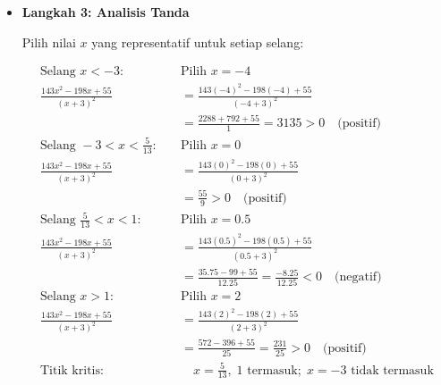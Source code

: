 \documentclass[10pt,a4paper]{article}
\newcounter{eqblock}
\newcommand{\reseteq}{%
  \stepcounter{eqblock}%
  \setcounter{equation}{0}%
  \renewcommand{\theHequation}{\arabic{eqblock}.\arabic{equation}}%
}
\begin{document}
\begin{enumerate}
\begin{itemize}
\begin{itemize}
Pembuat nol pembilang dan penyebut:

\reseteq
\begin{align}
143x^2 - 198x + 55 &= 0 \quad \text{(Pembuat nol pembilang)} \\
\text{Dengan } a = 143, b = -198, c = 55: & \\
x_1,x_2 &= \frac{-b \pm \sqrt{b^2 - 4ac}}{2a} \\
x_1,x_2 &= \frac{-(-198) \pm \sqrt{(-198)^2 - 4(143)(55)}}{2(143)} \\
x_1,x_2 &= \frac{198 \pm \sqrt{39204 - 31460}}{286} \\
x_1,x_2 &= \frac{198 \pm \sqrt{7744}}{286} = \frac{198 \pm 88}{286} \\
x_1 &= \frac{198 + 88}{286} = \frac{286}{286} = 1 \\
x_2 &= \frac{198 - 88}{286} = \frac{110}{286} = \frac{5}{13} \\
x + 3 &= 0 \Rightarrow x = -3 \quad \text{(Pembuat nol penyebut)}
\end{align}

\item \textbf{Langkah 3: Analisis Tanda}

Pilih nilai $x$ yang representatif untuk setiap selang:

\reseteq
\begin{align}
\text{Selang } x < -3: \quad &\text{Pilih } x = -4 \\
\frac{143x^2-198x+55}{(x+3)^2}
  &= \frac{143(-4)^2-198(-4)+55}{(-4+3)^2} \nonumber \\
  &= \frac{2288+792+55}{1} = 3135 > 0
  \quad \text{(positif)} \\
\text{Selang } -3 < x < \frac{5}{13}: \quad &\text{Pilih } x = 0 \\
\frac{143x^2-198x+55}{(x+3)^2}
  &= \frac{143(0)^2-198(0)+55}{(0+3)^2} \nonumber \\
  &= \frac{55}{9} > 0
  \quad \text{(positif)} \\
\text{Selang } \frac{5}{13} < x < 1: \quad &\text{Pilih } x = 0.5 \\
\frac{143x^2-198x+55}{(x+3)^2}
  &= \frac{143(0.5)^2-198(0.5)+55}{(0.5+3)^2} \nonumber \\
  &= \frac{35.75-99+55}{12.25} = \frac{-8.25}{12.25} < 0
  \quad \text{(negatif)} \\
\text{Selang } x > 1: \quad &\text{Pilih } x = 2 \\
\frac{143x^2-198x+55}{(x+3)^2}
  &= \frac{143(2)^2-198(2)+55}{(2+3)^2} \nonumber \\
  &= \frac{572-396+55}{25} = \frac{231}{25} > 0
  \quad \text{(positif)} \\
\text{Titik kritis:}
  &\quad x = \tfrac{5}{13},\; 1 \text{ termasuk};\; x = -3 \text{ tidak termasuk}
\end{align}


\end{itemize}
\end{itemize}
\end{enumerate}
\end{document}
